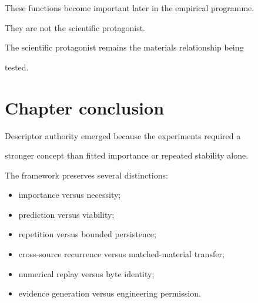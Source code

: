 \documentclass[11pt,a4paper,oneside]{report}
\begin{document}
These functions become important later in the empirical programme.



They are not the scientific protagonist.



The scientific protagonist remains the materials relationship being

tested.





\section{Chapter conclusion}



Descriptor authority emerged because the experiments required a

stronger concept than fitted importance or repeated stability alone.



The framework preserves several distinctions:



\begin{itemize}



\item

importance versus necessity;



\item

prediction versus viability;



\item

repetition versus bounded persistence;



\item

cross-source recurrence versus matched-material transfer;



\item

numerical replay versus byte identity;



\item

evidence generation versus engineering permission.



\end{itemize}
\end{document}
